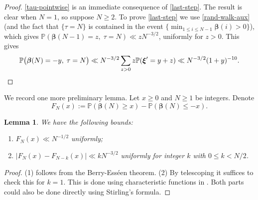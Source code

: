 \documentclass[11pt,reqno]{amsart}
\numberwithin{equation}{section}
\newtheorem{lemma}[theorem]{Lemma}
\theoremstyle{definition}
\theoremstyle{remark}
\newcommand{\mb}{\mathbb}
\def\boldbeta{\boldsymbol\beta}
\def\boldxi{\boldsymbol\xi}
\renewcommand{\le}{\leqslant}
\renewcommand{\ge}{\geqslant}
\begin{document}
\begin{proof}
\cref{tau-pointwise} is an immediate consequence of \cref{last-step}. The result is clear when $N = 1$, so suppose $N \ge 2$. To prove \cref{last-step} we use \cref{rand-walk-aux} (and the fact that $\{ \tau = N\}$ is contained in the event $\{\min_{1 \le i \le N-1} \boldbeta(i) > 0\}$), which gives $\mb{P}(\boldbeta(N - 1) = z, \;\tau = N) \ll z N^{-3/2}$, uniformly for $z > 0$. This gives
\[ \mb{P}\big(\boldbeta(N) = -y,\; \tau = N\big) \ll N^{-3/2} \sum_{z > 0} z \mb{P}(\boldxi' = y + z) \ll N^{-3/2} (1 + y)^{-10}. \qedhere \]
\end{proof}

We record one more preliminary lemma. Let $x \ge 0$ and $N \ge 1$ be integers. Denote
\[ F_N(x) := \mb{P}(\boldbeta(N) \ge x) - \mb{P}(\boldbeta(N) \le - x).\]
\begin{lemma}\label{techlem1}
We have the following bounds:
\begin{enumerate}
    \item $F_N(x) \ll N^{-1/2}$ uniformly;
    \item $|F_N(x) - F_{N - k}(x)| \ll k N^{-3/2}$ uniformly for integer $k$ with $0 \le k < N/2$.
\end{enumerate}
\end{lemma}
\begin{proof}
(1) follows from the Berry-Ess\'een theorem. (2) By telescoping it suffices to check this for $k = 1$. This is done using characteristic functions in \cite[Lemma 10]{DTW-berry-esseen}. Both parts could also be done directly using Stirling's formula. 
\end{proof}
\end{document}
